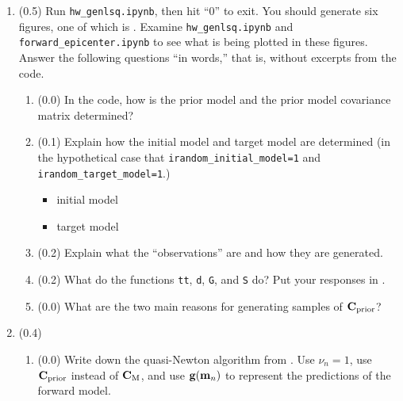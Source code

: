 \documentclass[11pt,titlepage,fleqn]{article}
\begin{document}
\clearpage\pagebreak
\begin{enumerate}
\item (0.5)
Run \verb+hw_genlsq.ipynb+, then hit ``0'' to exit. You should generate six figures, one of which is . Examine \verb+hw_genlsq.ipynb+ and \verb+forward_epicenter.ipynb+ to see what is being plotted in these figures. Answer the following questions ``in words,'' that is, without excerpts from the code.

\begin{enumerate}
\item (0.0) In the code, how is the prior model and the prior model covariance matrix determined?

\vspace{1cm}

\item (0.1) Explain how the initial model and target model are determined (in the hypothetical case that \verb+irandom_initial_model=1+ and \verb+irandom_target_model=1+.)

\begin{itemize}
\item initial model
\item target model
\end{itemize}

\item (0.2) Explain what the ``observations'' are and how they are generated.

\vspace{1cm}

\item (0.2) What do the functions \verb+tt+, \verb+d+, \verb+G+, and \verb+S+ do? Put your responses in .

\item (0.0) What are the two main reasons for generating samples of $\mbox{${\bf C}$}_{\rm prior}$?

\vspace{1cm}

\end{enumerate}



\item (0.4) 

\begin{enumerate}
\item (0.0) Write down the quasi-Newton algorithm from \citet[][Eq.~6.319]{Tarantola2005}. Use $\nu_n = 1$, use $\mbox{${\bf C}$}_{\rm prior}$ instead of $\mbox{${\bf C}$}_{\rm M}$, and use $\mbox{${\bf g}$}(\mbox{${\bf m}$}_n)$ to represent the predictions of the forward model.


\end{enumerate}
\end{enumerate}
\end{document}
